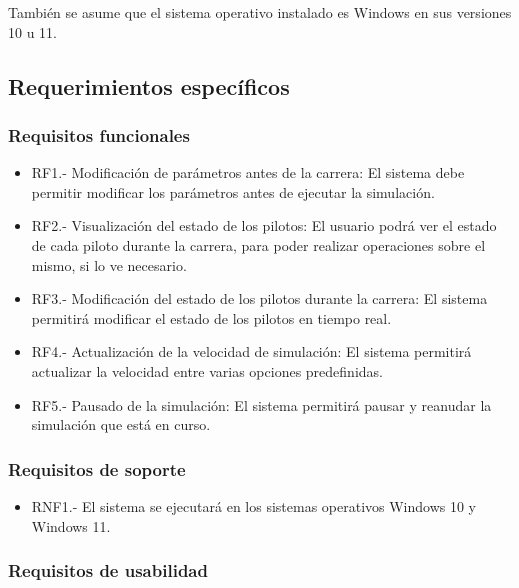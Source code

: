 \bigskip

También se asume que el sistema operativo instalado es Windows en sus versiones 10 u 11.

\subsection{Requerimientos específicos}

\subsubsection{Requisitos funcionales}

\begin{itemize}
    \item RF1.- Modificación de parámetros antes de la carrera: El sistema debe permitir modificar los parámetros antes de ejecutar la simulación.
    \item RF2.- Visualización del estado de los pilotos: El usuario podrá ver el estado de cada piloto durante la carrera, para poder realizar operaciones sobre el mismo, si lo ve necesario.
    \item RF3.- Modificación del estado de los pilotos durante la carrera: El sistema permitirá modificar el estado de los pilotos en tiempo real.
    \item RF4.- Actualización de la velocidad de simulación: El sistema permitirá actualizar la velocidad entre varias opciones predefinidas.
    \item RF5.- Pausado de la simulación: El sistema permitirá pausar y reanudar la simulación que está en curso.
\end{itemize}

\subsubsection{Requisitos de soporte}

\begin{itemize}
    \item RNF1.- El sistema se ejecutará en los sistemas operativos Windows 10 y Windows 11.
\end{itemize}

\subsubsection{Requisitos de usabilidad}

